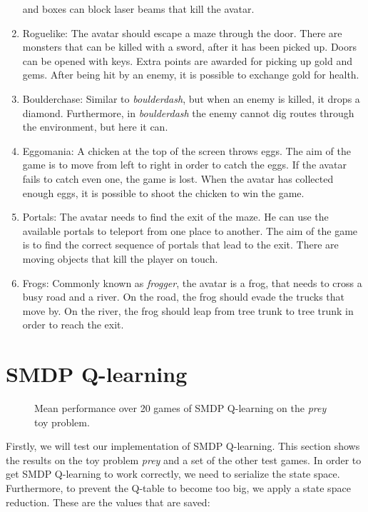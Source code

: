 \begin{enumerate}
		and boxes can block laser beams that kill the avatar.
	\item Roguelike:
		The avatar should escape a maze through the door. There are monsters
		that can be killed with a sword, after it has been picked up. Doors can
		be opened with keys. Extra points are awarded for picking up gold and
		gems. After being hit by an enemy, it is possible to exchange gold for
		health.
	\item Boulderchase:
		Similar to \textit{boulderdash}, but when an enemy is killed, it drops a
		diamond. Furthermore, in \textit{boulderdash} the enemy cannot dig
		routes through the environment, but here it can.
	\item Eggomania:
		A chicken at the top of the screen throws eggs. The aim of the game is
		to move from left to right in order to catch the eggs. If the avatar
		fails to catch even one, the game is lost. When the avatar
		has collected enough eggs, it is possible to shoot the chicken to win
		the game.
	\item Portals:
		The avatar needs to find the exit of the maze. He can use the available
		portals to teleport from one place to another. The aim of the game is to
		find the correct sequence of portals that lead to the exit. There are
		moving objects that kill the player on touch.
	\item Frogs:
		Commonly known as \textit{frogger}, the avatar is a frog, that needs to
		cross a busy road and a river. On the road, the frog should evade the
		trucks that move by. On the river, the frog should leap from tree trunk
		to tree trunk in order to reach the exit.
\end{enumerate}


\section{SMDP Q-learning}
\begin{figure}
	\centering
	\caption{Mean performance over 20 games of SMDP Q-learning on the
	\textit{prey} toy problem.}
	\label{fig:qlearning}
\end{figure}

Firstly, we will test our implementation of SMDP Q-learning. This section shows
the results on the toy problem \textit{prey} and a set of the other test games.
In order to get SMDP Q-learning to work correctly, we need to serialize the
state space. Furthermore, to prevent the Q-table to become too big, we apply a
state space reduction. These are the values that are saved:

